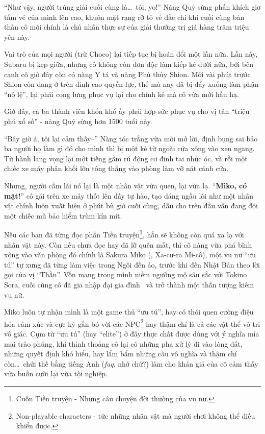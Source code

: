 \documentclass[../main.tex]{subfiles}
\begin{document}
``Như vậy, người trúng giải cuối cùng là\dots\ tôi, yo!'' Nàng Quỷ sừng phấn khích giơ tấm vé của mình lên cao, khuôn mặt rạng rỡ tỏ vẻ đắc chí khi cuối cùng bản thân cô mới chính là chủ nhân thực sự của giải thưởng trị giá hàng trăm triệu yên này.

\ct

Vai trò của mọi người (trừ Choco) lại tiếp tục bị hoán đổi một lần nữa. Lần này, Subaru bị kẹp giữa, nhưng cô không còn đơn độc làm kiếp kẻ dưới nữa, bởi bên cạnh cô giờ đây còn có nàng Y tá và nàng Phù thủy Shion. Mới vài phút trước Shion còn đang ở trên đỉnh cao quyền lực, thế mà nay đã bị đẩy xuống làm phận ``nô lệ'', lại phải cong lưng phục vụ lại cho chính kẻ mà cô vừa mới hầu hạ.

Giờ đây, cả ba thành viên khốn khổ ấy phải hợp sức phục vụ cho vị tân ``triệu phú xổ số'' - nàng Quỷ sừng hơn 1500 tuổi này.


``Bây giờ á, tôi lại cảm thấy--'' Nàng tóc trắng vừa mới mở lời, định bụng sai bảo ba người họ làm gì đó cho mình thì bị một kẻ từ ngoài cửa xông vào xen ngang. Từ hành lang vọng lại một tiếng gầm rú động cơ đinh tai nhức óc, và rồi một chiếc xe máy phân khối lớn tông thẳng vào phòng làm vỡ nát cánh cửa.


Nhưng, người cầm lái nó lại là một nhân vật vừa quen, lại vừa lạ. ``\textbf{Miko, có mặt!}'' cô gái trên xe máy thốt lên đầy tự hào, tạo dáng ngầu lòi như một nhân vật chính luôn xuất hiện ở phút bù giờ cuối cùng, dẫu cho trên đầu vẫn đang đội một chiếc mũ bảo hiểm trùm kín mít.

\chrint


Nếu các bạn đã từng đọc phần Tiền truyện\footnote{Cuốn Tiền truyện - Những câu chuyện đời thường của vu nữ.}, hẳn sẽ không còn quá xa lạ với nhân vật này. Còn nếu chưa đọc hay đã lỡ quên mất, thì cô nàng vừa phá bĩnh xông vào văn phòng đó chính là Sakura Miko (, Xa-cư-ra Mi-cô), một vu nữ ``ưu tú'' tự xưng đã từng làm việc trong Ngôi đền ảo, trước khi đến Nhật Bản theo lời gọi của vị ``Thần''. Vốn mang trong mình niềm ngưỡng mộ sâu sắc với Tokino Sora, cuối cùng cô đã gia nhập đại gia đình \hll\ và trở thành một thần tượng kiêm vu nữ.


Miko luôn tự nhận mình là một game thủ ``ưu tú'', hay có thói quen cường điệu hóa cảm xúc và cực kỳ gắn bó với các NPC\footnote{Non-playable characters - tức những nhân vật mà người chơi không thể điều khiển được.} hay thậm chí là cả các vật thể vô tri vô giác. Cụm từ ``ưu tú'' (hay ``elite'') ở đây thực chất được dùng với ý nghĩa mỉa mai trào phúng, khi thỉnh thoảng cô lại có những pha xử lý đi vào lòng đất, những quyết định khó hiểu, hay lẩm bẩm những câu vô nghĩa và thậm chí còn\dots\ chửi thề bằng tiếng Anh (\textit{faq}, nhớ chứ?) làm cho khán giả của cô cảm thấy vừa buồn cười lại vừa tội nghiệp.
\end{document}
